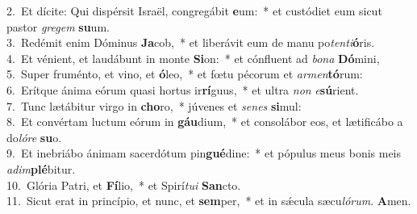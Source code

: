 {2.~}Et dícite: Qui dispérsit Israël, congregábit \textbf{e}um:~* et custódiet eum sicut pastor \textit{gre}\textit{gem} \textbf{su}um.\\
{3.~}Redémit enim Dóminus \textbf{Ja}cob,~* et liberávit eum de manu po\textit{ten}\textit{ti}\textbf{ó}ris.\\
{4.~}Et vénient, et laudábunt in monte \textbf{Si}on:~* et cónfluent ad \textit{bo}\textit{na} \textbf{Dó}mini,\\
{5.~}Super fruménto, et vino, et \textbf{ó}leo,~* et fœtu pécorum et \textit{ar}\textit{men}\textbf{tó}rum:\\
{6.~}Erítque ánima eórum quasi hortus ir\textbf{rí}guus,~* et ultra \textit{non} \textit{e}\textbf{sú}rient.\\
{7.~}Tunc lætábitur virgo in \textbf{cho}ro,~* júvenes et \textit{se}\textit{nes} \textbf{si}mul:\\
{8.~}Et convértam luctum eórum in \textbf{gáu}dium,~* et consolábor eos, et lætificábo a do\textit{ló}\textit{re} \textbf{su}o.\\
{9.~}Et inebriábo ánimam sacerdótum pin\textbf{gué}dine:~* et pópulus meus bonis meis \textit{a}\textit{dim}\textbf{plé}bitur.\\
{10.~}Glória Patri, et \textbf{Fí}lio,~* et Spirí\textit{tu}\textit{i} \textbf{San}cto.\\
{11.~}Sicut erat in princípio, et nunc, et \textbf{sem}per,~* et in sǽcula sæcu\textit{ló}\textit{rum}. \textbf{A}men.\\
